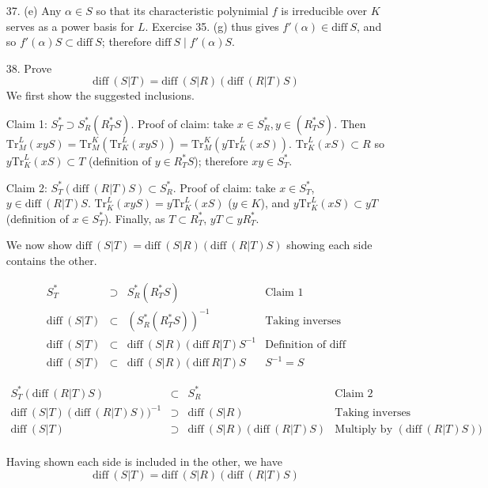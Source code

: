 \documentclass{article}
\newcommand{\diff}[1]{\text{diff}\ #1}
\begin{document}
\begin{enumerate}
\item[37. (e)] Any $\alpha \in S$ so that its characteristic polynimial $f$ is irreducible over $K$ serves as a power basis for $L$.  Exercise 35. (g) thus gives $f'(\alpha) \in \diff{S}$, and so $f'(\alpha)S \subset \diff{S}$; therefore $\diff S \mid f'(\alpha)S$.

\item[38.] Prove \[ \diff(S|T) = \diff(S|R)(\diff(R|T)S) \] We first show the suggested inclusions.

Claim 1: $S^{*}_{T} \supset S^{*}_{R}(R^{*}_{T}S)$.  Proof of claim: take $x \in S^{*}_{R}, y \in (R^{*}_{T}S)$.  Then $\text{Tr}^{L}_{M}(xyS) = \text{Tr}^{K}_{M}(\text{Tr}^{L}_{K}(xyS)) = \text{Tr}^{K}_{M}(y\text{Tr}^{L}_{K}(xS))$.  $\text{Tr}^{L}_{K}(xS) \subset R$ so $y\text{Tr}^{L}_{K}(xS) \subset T$ (definition of $y \in R^{*}_{T}S$); therefore $xy \in S^{*}_{T}$.

Claim 2: $S^{*}_{T}(\diff(R|T)S) \subset S_{R}^{*}$.  Proof of claim: take $x \in S^{*}_{T}$, $y \in \diff(R|T)S$.  $\text{Tr}^{L}_{K}(xyS) = y \text{Tr}^{L}_{K}(xS)$ ($y \in K$), and $y \text{Tr}^{L}_{K}(xS) \subset yT$ (definition of $x \in S^{*}_{T}$).  Finally, as $T \subset R^{*}_{T}$, $yT \subset yR^{*}_{T}$.

We now show $\diff(S|T) = \diff(S|R)(\diff(R|T)S)$ showing each side contains the other.

\[
\begin{array}{llll}
    S^{*}_{T} &\supset& S^{*}_{R}(R^{*}_{T}S) & \text{Claim 1} \\
    \diff(S|T) &\subset& (S^{*}_{R}(R^{*}_{T}S))^{-1} & \text{Taking inverses} \\
    \diff(S|T) &\subset& \diff(S|R)(\diff{R|T})S^{-1} & \text{Definition of diff} \\
    \diff(S|T) &\subset& \diff(S|R)(\diff{R|T})S & \text{$S^{-1} = S$}
\end{array}
\]

\[
\begin{array}{llll}
    S^{*}_{T}(\diff(R|T)S) &\subset& S_{R}^{*} & \text{Claim 2} \\
    \diff(S|T)(\diff(R|T)S))^{-1} &\supset& \diff(S|R) & \text{Taking inverses} \\
    \diff(S|T) &\supset& \diff(S|R)(\diff(R|T)S) & \text{Multiply by $(\diff(R|T)S))$} \\
\end{array}
\]

Having shown each side is included in the other, we have \[ \diff(S|T) = \diff(S|R)(\diff(R|T)S) \]


\end{enumerate}
\end{document}

